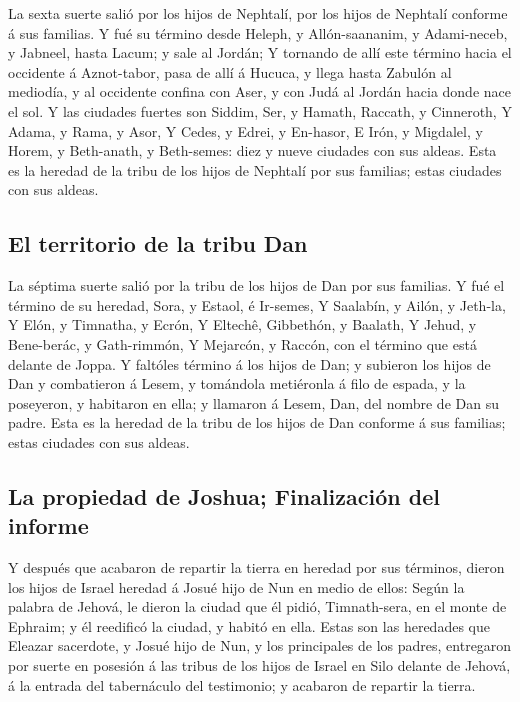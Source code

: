  La sexta suerte salió por los hijos de Nephtalí, por los
hijos de Nephtalí conforme á sus familias.  Y fué su
término desde Heleph, y Allón-saananim, y Adami-neceb, y Jabneel, hasta
Lacum; y sale al Jordán;  Y tornando de allí este término
hacia el occidente á Aznot-tabor, pasa de allí á Hucuca, y llega hasta
Zabulón al mediodía, y al occidente confina con Aser, y con Judá al
Jordán hacia donde nace el sol.  Y las ciudades fuertes son
Siddim, Ser, y Hamath, Raccath, y Cinneroth,  Y Adama, y
Rama, y Asor,  Y Cedes, y Edrei, y En-hasor, 
E Irón, y Migdalel, y Horem, y Beth-anath, y Beth-semes: diez y nueve
ciudades con sus aldeas.  Esta es la heredad de la tribu de
los hijos de Nephtalí por sus familias; estas ciudades con sus aldeas.

\hypertarget{el-territorio-de-la-tribu-dan}{%
\subsection{El territorio de la tribu
Dan}\label{el-territorio-de-la-tribu-dan}}

 La séptima suerte salió por la tribu de los hijos de Dan
por sus familias.  Y fué el término de su heredad, Sora, y
Estaol, é Ir-semes,  Y Saalabín, y Ailón, y Jeth-la,
 Y Elón, y Timnatha, y Ecrón,  Y Eltechê,
Gibbethón, y Baalath,  Y Jehud, y Bene-berác, y
Gath-rimmón,  Y Mejarcón, y Raccón, con el término que está
delante de Joppa.  Y faltóles término á los hijos de Dan; y
subieron los hijos de Dan y combatieron á Lesem, y tomándola metiéronla
á filo de espada, y la poseyeron, y habitaron en ella; y llamaron á
Lesem, Dan, del nombre de Dan su padre.  Esta es la heredad
de la tribu de los hijos de Dan conforme á sus familias; estas ciudades
con sus aldeas.

\hypertarget{la-propiedad-de-joshua-finalizaciuxf3n-del-informe}{%
\subsection{La propiedad de Joshua; Finalización del
informe}\label{la-propiedad-de-joshua-finalizaciuxf3n-del-informe}}

 Y después que acabaron de repartir la tierra en heredad
por sus términos, dieron los hijos de Israel heredad á Josué hijo de Nun
en medio de ellos:  Según la palabra de Jehová, le dieron
la ciudad que él pidió, Timnath-sera, en el monte de Ephraim; y él
reedificó la ciudad, y habitó en ella.  Estas son las
heredades que Eleazar sacerdote, y Josué hijo de Nun, y los principales
de los padres, entregaron por suerte en posesión á las tribus de los
hijos de Israel en Silo delante de Jehová, á la entrada del tabernáculo
del testimonio; y acabaron de repartir la tierra.

